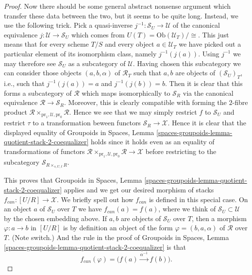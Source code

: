 \begin{proof}
\medskip\noindent
Now there should be some general abstract nonsense
argument which transfer these data between the two, but it seems to
be quite long. Instead, we use the following trick.
Pick a quasi-inverse $j^{-1} : \mathcal{S}_U \to \mathcal{U}$
of the canonical equivalence $j : \mathcal{U} \to \mathcal{S}_U$ which comes
from $U(T) = \text{Ob}(\mathcal{U}_T)/\!\!\cong$.
This just means that for every scheme $T/S$ and every
object $a \in \mathcal{U}_T$ we have picked out a particular
element of its isomorphism class, namely $j^{-1}(j(a))$.
Using $j^{-1}$ we may therefore see $\mathcal{S}_U$
as a subcategory of $\mathcal{U}$. Having chosen this subcategory
we can consider those objects $(a, b, \alpha)$ of $\mathcal{R}_T$
such that $a, b$ are objects of $(\mathcal{S}_U)_T$, i.e., such
that $j^{-1}(j(a)) = a$ and $j^{-1}(j(b)) = b$. Then it is clear that
this forms a subcategory of $\mathcal{R}$ which maps isomorphically
to $\mathcal{S}_R$ via the canonical equivalence
$\mathcal{R} \to \mathcal{S}_R$. Moreover, this is clearly compatible
with forming the $2$-fibre product
$\mathcal{R} \times_{\text{pr}_1, \mathcal{U}, \text{pr}_0} \mathcal{R}$.
Hence we see that we may simply restrict
$f$ to $\mathcal{S}_U$ and restrict $\tau$ to a transformation
beween functors $\mathcal{S}_R \to \mathcal{X}$. Hence it is clear that
the displayed equality of
Groupoids in Spaces,
Lemma \ref{spaces-groupoids-lemma-quotient-stack-2-coequalizer}
holds since it holds even as an equality of transformations of functors
$\mathcal{R} \times_{\text{pr}_1, \mathcal{U}, \text{pr}_0} \mathcal{R}
\to \mathcal{X}$ before restricting to the subcategory
$\mathcal{S}_{R \times_{s, U, t} R}$.

\medskip\noindent
This proves that
Groupoids in Spaces,
Lemma \ref{spaces-groupoids-lemma-quotient-stack-2-coequalizer}
applies and we get our desired morphism of stacks
$f_{can} : [U/R] \to \mathcal{X}$. We briefly spell out how
$f_{can}$ is defined in this special case.
On an object $a$ of $\mathcal{S}_U$ over $T$
we have $f_{can}(a) = f(a)$, where we think of
$\mathcal{S}_U \subset \mathcal{U}$ by the chosen embedding above.
If $a, b$ are objects of $\mathcal{S}_U$ over $T$, then a morphism
$\varphi : a \to b$ in $[U/R]$ is by definition an object of the
form $\varphi = (b, a, \alpha)$ of $\mathcal{R}$ over $T$. (Note
switch.) And the rule in the proof of
Groupoids in Spaces,
Lemma \ref{spaces-groupoids-lemma-quotient-stack-2-coequalizer}
is that
\begin{equation}
\label{equation-on-morphisms}
f_{can}(\varphi) = \Big(f(a) \xrightarrow{\alpha^{-1}} f(b)\Big).
\end{equation}


\end{proof}
